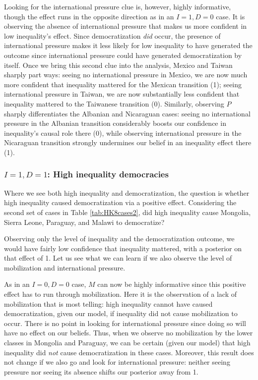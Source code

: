 \documentclass[
  12pt,
]{book}
\begin{document}
Looking for the international pressure clue is, however, highly informative, though the effect runs in the opposite direction as in an \(I=1, D=0\) case. It is observing the absence of international pressure that makes us more confident in low inequality's effect. Since democratization \emph{did} occur, the presence of international pressure makes it less likely for low inequality to have generated the outcome since international pressure could have generated democratization by itself. Once we bring this second clue into the analysis, Mexico and Taiwan sharply part ways: seeing no international pressure in Mexico, we are now much more confident that inequality mattered for the Mexican transition (1); seeing international pressure in Taiwan, we are now substantially less confident that inequality mattered to the Taiwanese transition (0). Similarly, observing \(P\) sharply differentiates the Albanian and Nicaraguan cases: seeing no international pressure in the Albanian transition considerably boosts our confidence in inequality's causal role there (0), while observing international pressure in the Nicaraguan transition strongly undermines our belief in an inequality effect there (1).

\hypertarget{i1-d1-high-inequality-democracies}{%
\subsubsection{\texorpdfstring{\(I=1, D=1\): High inequality democracies}{I=1, D=1: High inequality democracies}}\label{i1-d1-high-inequality-democracies}}

Where we see both high inequality and democratization, the question is whether high inequality caused democratization via a positive effect. Considering the second set of cases in Table \ref{tab:HK8cases2}, did high inequality cause Mongolia, Sierra Leone, Paraguay, and Malawi to democratize?

Observing only the level of inequality and the democratization outcome, we would have fairly low confidence that inequality mattered, with a posterior on that effect of 1. Let us see what we can learn if we also observe the level of mobilization and international pressure.

As in an \(I=0, D=0\) case, \(M\) can now be highly informative since this positive effect has to run through mobilization. Here it is the observation of a lack of mobilization that is most telling: high inequality cannot have caused democratization, given our model, if inequality did not cause mobilization to occur. There is no point in looking for international pressure since doing so will have no effect on our beliefs. Thus, when we observe no mobilization by the lower classes in Mongolia and Paraguay, we can be certain (given our model) that high inequality did \emph{not} cause democratization in these cases. Moreover, this result does not change if we also go and look for international pressure: neither seeing pressure nor seeing its absence shifts our posterior away from 1.
\end{document}
